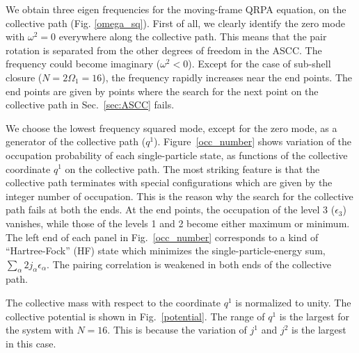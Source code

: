 \documentclass[%
superscriptaddress,
showpacs,
nofootinbib,
amsmath,amssymb,
aps,
prc,
twocolumn,
floatfix ]%
{revtex4-1}
\begin{document}
We obtain three eigen frequencies for the moving-frame QRPA equation, 
on the collective path (Fig. \ref{omega_sq}). 
First of all, we clearly identify the zero mode with $\omega^2=0$
everywhere along the collective path.
This means that the pair rotation is separated from the other
degrees of freedom in the ASCC.
The frequency could become imaginary ($\omega^2<0$).
Except for the case of sub-shell closure ($N=2\Omega_1=16$),
the frequency rapidly increases near the end points.
The end points are given by points where the search for the next point
on the collective path in Sec.~\ref{sec:ASCC} fails.

We choose the lowest frequency squared mode, except for the zero mode,
as a generator of the collective path ($q^1$).
Figure~\ref{occ_number} shows variation of the occupation probability
of each single-particle state, as functions of the collective
coordinate $q^1$ on the collective path.
The most striking feature is that the collective path terminates
with special configurations which are given by the integer number
of occupation.
This is the reason why the search for the collective path fails
at both the ends.
At the end points,
the occupation of the level 3 ($\epsilon_3$) vanishes, while
those of the levels 1 and 2 become either maximum or minimum.
The left end of each panel in Fig.~\ref{occ_number} corresponds to 
a kind of ``Hartree-Fock'' (HF) state which minimizes
the single-particle-energy sum, $\sum_\alpha 2j_\alpha \epsilon_\alpha$.
The pairing correlation is weakened in both ends of the
collective path.

The collective mass with respect to the coordinate $q^1$ is normalized
to unity.
The collective potential is shown in Fig.~\ref{potential}.
The range of $q^1$ is the largest for the system with $N=16$.
This is because the variation of $j^1$ and $j^2$ is the largest in
this case.
\end{document}
